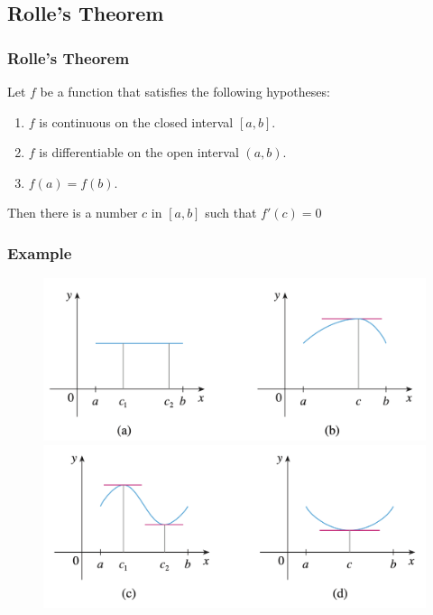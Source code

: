 \documentclass[t]{beamer}
\theoremstyle{plain}
\theoremstyle{definition}
\begin{document}
\subsection{Rolle's Theorem}

\begin{frame}
\frametitle{Rolle's Theorem}

\begin{theorem}
Let $f$ be a function that satisfies the following hypotheses:
\begin{enumerate}
\item $f$ is continuous on the closed interval $[a,b]$.
\item $f$ is differentiable on the open interval $(a,b)$.
\item $f(a) = f(b)$.
\end{enumerate}
Then there is a number $c$ in $[a,b]$ such that $f'(c)=0$
\end{theorem}

\end{frame}


\begin{frame}

\frametitle{Example}

\begin{figure}[t]
\begin{center}
\includegraphics[scale=0.35]{fig/rolle1}
\includegraphics[scale=0.35]{fig/rolle2}
\end{center}
\end{figure}

\end{frame}
\end{document}

